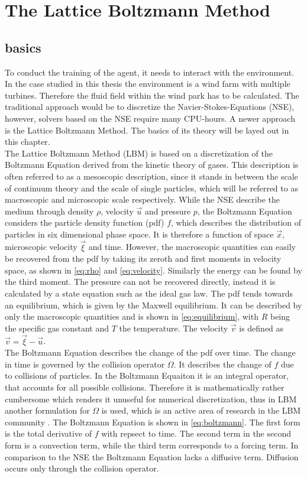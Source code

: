 \section{The Lattice Boltzmann Method}
\subsection{basics}
To conduct the training of the agent, it needs to interact with the environment. In the case studied in this thesis the environment is a wind farm with multiple turbines. Therefore the fluid field within the wind park has to be calculated. The traditional approach would be to discretize the Navier-Stokes-Equations (NSE), however, solvers based on the NSE require many CPU-hours. A newer approach is the Lattice Boltzmann Method. The basics of its theory will be layed out in this chapter. \\ 
The Lattice Boltzmann Method (LBM) is based on a discretization of the Boltzmann Equation derived from the kinetic theory of gases. This description is often referred to as a mesoscopic description, since it stands in  between the scale of continuum theory and the scale of single particles, which will be referred to as macroscopic and microscopic scale respectively. While the NSE describe the medium through density $\rho$, velocity $\vec{u}$ and pressure $p$, the Boltzmann Equation considers the particle density function (pdf) $f$, which describes the distribution of particles in six dimensional phase space. It is therefore a function of space $\vec{x}$, microscopic velocity $\vec{\xi}$ and time. However, the macroscopic quantities can easily be recovered from the pdf by taking its zeroth and first moments in velocity space, as shown in \eqref{eq:rho} and \eqref{eq:velocity}. Similarly the energy can be found by the third moment. The pressure can not be recovered directly, instead it is calculated by a state equation such as the ideal gas law. The pdf tends towards an equilibrium, which is given by the Maxwell equilibrium. It can be described by only the macroscopic quantities and is shown in \eqref{eq:equilibrium}, with $R$ being the specific gas constant and $T$ the temperature. The velocity $\vec{v}$ is defined as $\vec{v} = \vec{\xi}-\vec{u}$.\cite[p. 15- 21]{kruger_lattice_2017} \\
The Boltzmann Equation describes the change of the pdf over time. The change in time is governed by the collision operator $\Omega$. It describes the change of $f$ due to collisions of particles. In the Boltzmann Equaiton it is an integral operator, that accounts for all possible collisions. Therefore it is mathematically rather cumbersome which renders it unuseful for numerical discretization, thus in LBM another formulation for $\Omega$ is used, which is an active area of research in the LBM community \cite{coreixas_comprehensive_2019}. The Boltzmann Equation is shown in \eqref{eq:boltzmann}. The first form is the total derivative of $f$ with repsect to time. The second term in the second form is a convection term, while the third term corresponds to a forcing term. In comparison to the NSE the Boltzmann Equation lacks a diffusive term. Diffusion occurs only through the collision operator. \cite[p. 21]{kruger_lattice_2017}
